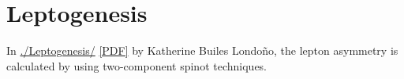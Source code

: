 \chapter{Leptogenesis}



In \url{./Leptogenesis/} \href{https://github.com/restrepo/beyond-the-standard-model/raw/master/Leptogenesis/main.pdf}{[PDF]} by Katherine Builes Londoño, the lepton asymmetry is calculated by using two-component spinot techniques.
